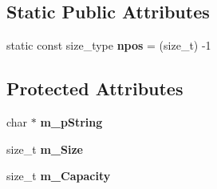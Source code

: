 \subsection*{Static Public Attributes}
\begin{DoxyCompactItemize}
\item 
\hypertarget{class_c_p_v_r_t_string_a730e8d6ecee3b20ef8d02580fe57b552}{static const size\+\_\+type {\bfseries npos} = (size\+\_\+t) -\/1}\label{class_c_p_v_r_t_string_a730e8d6ecee3b20ef8d02580fe57b552}

\end{DoxyCompactItemize}
\subsection*{Protected Attributes}
\begin{DoxyCompactItemize}
\item 
\hypertarget{class_c_p_v_r_t_string_ab18740beb7cff172a602739a8acf46d4}{char $\ast$ {\bfseries m\+\_\+p\+String}}\label{class_c_p_v_r_t_string_ab18740beb7cff172a602739a8acf46d4}

\item 
\hypertarget{class_c_p_v_r_t_string_a4519f2290c133aada40dbd82198c1630}{size\+\_\+t {\bfseries m\+\_\+\+Size}}\label{class_c_p_v_r_t_string_a4519f2290c133aada40dbd82198c1630}

\item 
\hypertarget{class_c_p_v_r_t_string_aaefbb02d87806b3bf36902a543e9a07a}{size\+\_\+t {\bfseries m\+\_\+\+Capacity}}\label{class_c_p_v_r_t_string_aaefbb02d87806b3bf36902a543e9a07a}

\end{DoxyCompactItemize}
